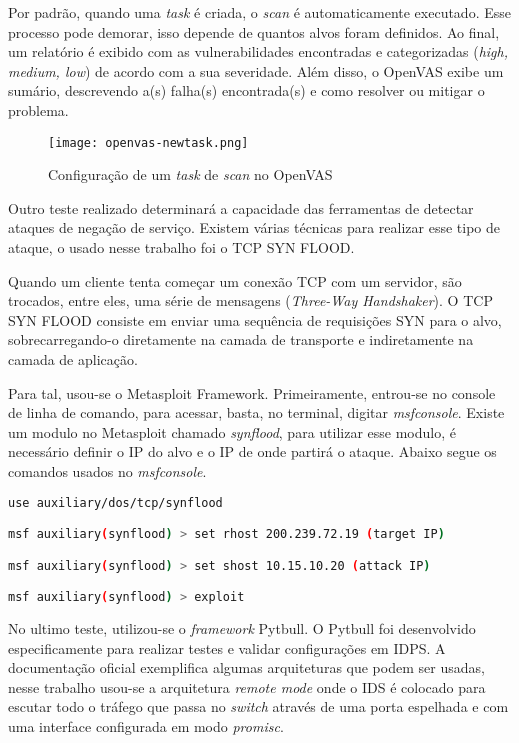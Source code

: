 Por padrão, quando uma \textit{task} é criada, o \textit{scan} é automaticamente executado. Esse processo pode demorar, isso depende de quantos alvos foram definidos. Ao final, um relatório é exibido com as vulnerabilidades encontradas e categorizadas (\textit{high, medium, low}) de acordo com a sua severidade. Além disso, o OpenVAS exibe um sumário, descrevendo a(s) falha(s) encontrada(s) e como resolver ou mitigar o problema.

\begin{figure}[!htb]
\centering
\caption{Configuração de um \textit{task} de \textit{scan} no OpenVAS}
\texttt{[image: openvas-newtask.png]}
\label{fig:openvas-newtask}
\end{figure}

Outro teste realizado determinará a capacidade das ferramentas de detectar ataques de negação de serviço. Existem várias técnicas para realizar esse tipo de ataque, o usado nesse trabalho foi o TCP SYN FLOOD. 

Quando um cliente tenta começar um conexão TCP com um servidor, são trocados, entre eles, uma série de mensagens (\textit{Three-Way Handshaker}). O TCP SYN FLOOD consiste em enviar uma sequência de requisições SYN para o alvo, sobrecarregando-o diretamente na camada de transporte e indiretamente na camada de aplicação.

Para tal, usou-se o Metasploit Framework. Primeiramente, entrou-se no console de linha de comando, para acessar, basta, no terminal, digitar \textit{msfconsole}. Existe um modulo no Metasploit chamado \textit{synflood}, para utilizar esse modulo, é necessário definir o IP do alvo e o IP de onde partirá o ataque. Abaixo segue os comandos usados no \textit{msfconsole}.

\begin{lstlisting}[title={Comando usados no Metasploit para ataque de negação de serviço},language=bash, frame=single, label={lst:synflood}]
use auxiliary/dos/tcp/synflood

msf auxiliary(synflood) > set rhost 200.239.72.19 (target IP)

msf auxiliary(synflood) > set shost 10.15.10.20 (attack IP)

msf auxiliary(synflood) > exploit
\end{lstlisting}

No ultimo teste, utilizou-se o \textit{framework} Pytbull. O Pytbull foi desenvolvido especificamente para realizar testes e validar configurações em IDPS. A documentação oficial exemplifica algumas arquiteturas que podem ser usadas, nesse trabalho usou-se a arquitetura \textit{remote mode} onde o IDS é colocado para escutar todo o tráfego que passa no \textit{switch} através de uma porta espelhada e com uma interface configurada em modo \textit{promisc}.

